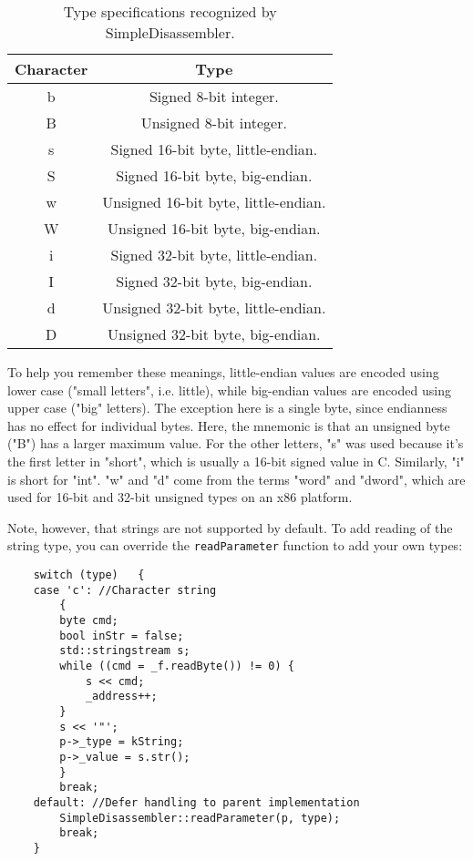 \begin{table}[!hpbt]
\centering
\begin{tabular}{c | c}
Character & Type \\
\hline
b & Signed 8-bit integer. \\
B & Unsigned 8-bit integer. \\
s & Signed 16-bit byte, little-endian. \\
S & Signed 16-bit byte, big-endian. \\
w & Unsigned 16-bit byte, little-endian. \\
W & Unsigned 16-bit byte, big-endian. \\
i & Signed 32-bit byte, little-endian. \\
I & Signed 32-bit byte, big-endian. \\
d & Unsigned 32-bit byte, little-endian. \\
D & Unsigned 32-bit byte, big-endian. \\
\end{tabular}
\caption{Type specifications recognized by SimpleDisassembler.}
\label{tbl:paramtypes}
\end{table}

To help you remember these meanings, little-endian values are encoded using lower case ("small letters", i.e. little), while big-endian values are encoded using upper case ("big" letters). The exception here is a single byte, since endianness has no effect for individual bytes. Here, the mnemonic is that an unsigned byte ("B") has a larger maximum value. For the other letters, "s" was used because it's the first letter in "short", which is usually a 16-bit signed value in C. Similarly, "i" is short for "int". "w" and "d" come from the terms "word" and "dword", which are used for 16-bit and 32-bit unsigned types on an x86 platform.

Note, however, that strings are not supported by default. To add reading of the string type, you can override the \verb+readParameter+ function to add your own types:

\begin{C++}
\begin{lstlisting}
	switch (type)	{
	case 'c': //Character string
		{
		byte cmd;
		bool inStr = false;
		std::stringstream s;
		while ((cmd = _f.readByte()) != 0) {
			s << cmd;
			_address++;
		}
		s << '"';
		p->_type = kString;
		p->_value = s.str();
		}
		break;
	default: //Defer handling to parent implementation
		SimpleDisassembler::readParameter(p, type);
		break;
	}
\end{lstlisting}
\end{C++}

